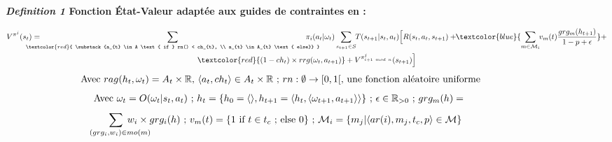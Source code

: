 \begin{figure}[h!]
  \label{eq:single_value_function}
  \raggedright
  \textbf{\textit{Definition 1} \quad Fonction État-Valeur adaptée aux guides de contraintes en  :}

  \begin{scriptsize}
    \vspace{-0.6cm}
    \begin{gather*}
      V^{\pi^j}(s_t) = \hspace{-0.75cm}
      \sum_{\textcolor{red}{ \substack{a_{t} \in A \text{ if } rn() < ch_{t}, \\
            a_{t} \in A_{t} \text{ else}}
        }}{\hspace{-0.7cm} \pi_i(a_{t} | \omega_t)}
      \sum_{s_{t+1} \in S}
      {\hspace{-0.1cm} T(s_{t+1} | s_t, a_{t})
      \Bigl[R(s_t,a_{t},s_{t+1}) + \hspace{-0.1cm}
      \textcolor{blue}{ \sum_{m \in \mathcal{M}_i}{ \hspace{-0.1cm} v_m(t) \frac{grg_m(h_{t+1})}{1 - p + \epsilon} } }
      + } \\
      {\textcolor{red}{(1-ch_t) \times rrg(\omega_t,a_{t+1})} + V^{\pi^j_{i+1 \ mod \ n}}(s_{t+1})\Bigr]}
    \end{gather*}
    \vspace{-0.5cm}
    \textcolor{red}{\[\text{ \hspace{-0.1cm} Avec } rag(h_t, \omega_t) = A_{t} \times \mathbb{R} \text{, } \langle a_t, ch_{t} \rangle \in A_{t} \times \mathbb{R} \text{ ; } rn: \emptyset \to [0,1[ \text{, une fonction aléatoire uniforme}\]}
    \vspace{-0.6cm}
    \textcolor{blue}{
      \begin{gather*}
        \hspace{-0.001cm}
        \text{Avec } \omega_t = O(\omega_t | s_t, a_t) \text{ ; } h_t = \{h_0 = \langle \rangle, h_{t+1} = \langle h_t, \langle \omega_{t+1}, a_{t+1} \rangle \rangle \} \text{ ; } \epsilon \in \mathbb{R}_{>0} \text{ ; } grg_m(h) =
      \end{gather*}
    }
    \vspace{-0.95cm}
    \textcolor{blue}{
      \begin{gather*}
        \hspace{-0.5cm} \sum_{\hspace{0.3cm}(grg_i,w_i) \in mo(m)}{\hspace{-0.9cm} w_i \times grg_i(h)}
        \text{ ; } v_m(t) = \{ 1 \text{ if } t \in t_c \text{ ; else } 0 \} \text{ ; } \mathcal{M}_i = \{m_j | \langle ar(i),m_j,t_c,p \rangle \in \mathcal{M}\}
      \end{gather*}
    }
    \vspace{-0.6cm}
  \end{scriptsize}

\end{figure}

